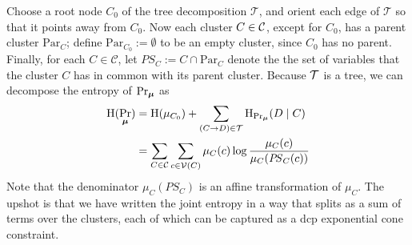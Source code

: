 \documentclass[twoside]{article}
\begin{document}
\def\Par{\mathrm{Par}}
\def\Pash{\mathit{P\!S}}

Choose a root node $C_0$ of the tree decomposition $\mathcal T$, and orient each edge of $\mathcal T$ so that it points away from $C_0$. 
Now each cluster $C \in \cal C$, except for $C_0$, has a parent cluster $\Par_C$;
define $\Par_{C_0} := \emptyset$ to be an empty cluster, since $C_0$ has no parent. 
Finally, for each $C \in \mathcal C$, let $\Pash_C := C \cap \Par_C$ denote the
the set of variables that the cluster $C$ has in common with its parent cluster.
Because $\cal T$ is a tree, we can decompose the entropy of $\Pr_{\boldsymbol\mu}$ as 
%
\begin{align*}
    \H(\Pr_{\bmu}) &= 
        \H(\mu_{C_0}) + 
        \sum_{(C \to D) \in \mathcal T}
        \H_{\Pr_{\bmu}}(D \mid C)\\
    &= \sum_{C \in \cal C} 
        \sum_{c \in \V(C)} \mu_C(c) \log \frac
            {\mu_C(c)}{\mu_C( \Pash_C(c) )}
\end{align*}
%
Note that the denominator $\mu_C(\Pash_C)$ is an affine transformation of $\mu_C$.
The upshot is that we have written the joint entropy in a way that 
splits as a sum of terms over the clusters, each of which can be captured as a dcp exponential cone constraint. 
\end{document}
